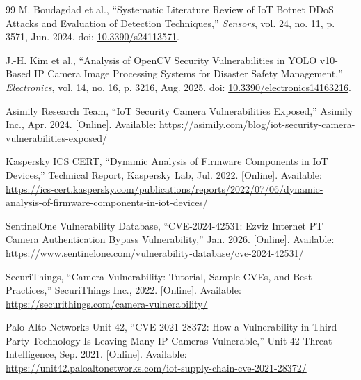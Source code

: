 \documentclass[letterpaper, 10pt, conference]{ieeeconf}
\begin{document}
\begin{thebibliography}{99}
M. Boudagdad et al.,
``Systematic Literature Review of IoT Botnet DDoS Attacks
and Evaluation of Detection Techniques,''
\textit{Sensors}, vol. 24, no. 11, p. 3571, Jun. 2024.
doi: \href{https://doi.org/10.3390/s24113571}{10.3390/s24113571}.

J.-H. Kim et al.,
``Analysis of OpenCV Security Vulnerabilities in YOLO v10-Based
IP Camera Image Processing Systems for Disaster Safety Management,''
\textit{Electronics}, vol. 14, no. 16, p. 3216, Aug. 2025.
doi: \href{https://doi.org/10.3390/electronics14163216}{10.3390/electronics14163216}.

Asimily Research Team,
``IoT Security Camera Vulnerabilities Exposed,''
Asimily Inc., Apr. 2024.
[Online]. Available:
\url{https://asimily.com/blog/iot-security-camera-vulnerabilities-exposed/}

Kaspersky ICS CERT,
``Dynamic Analysis of Firmware Components in IoT Devices,''
Technical Report, Kaspersky Lab, Jul. 2022.
[Online]. Available:
\url{https://ics-cert.kaspersky.com/publications/reports/2022/07/06/dynamic-analysis-of-firmware-components-in-iot-devices/}

SentinelOne Vulnerability Database,
``CVE-2024-42531: Ezviz Internet PT Camera Authentication
Bypass Vulnerability,'' Jan. 2026.
[Online]. Available:
\url{https://www.sentinelone.com/vulnerability-database/cve-2024-42531/}

SecuriThings,
``Camera Vulnerability: Tutorial, Sample CVEs, and Best Practices,''
SecuriThings Inc., 2022.
[Online]. Available: \url{https://securithings.com/camera-vulnerability/}

Palo Alto Networks Unit 42,
``CVE-2021-28372: How a Vulnerability in Third-Party Technology
Is Leaving Many IP Cameras Vulnerable,''
Unit 42 Threat Intelligence, Sep. 2021.
[Online]. Available:
\url{https://unit42.paloaltonetworks.com/iot-supply-chain-cve-2021-28372/}

\end{thebibliography}
\end{document}
